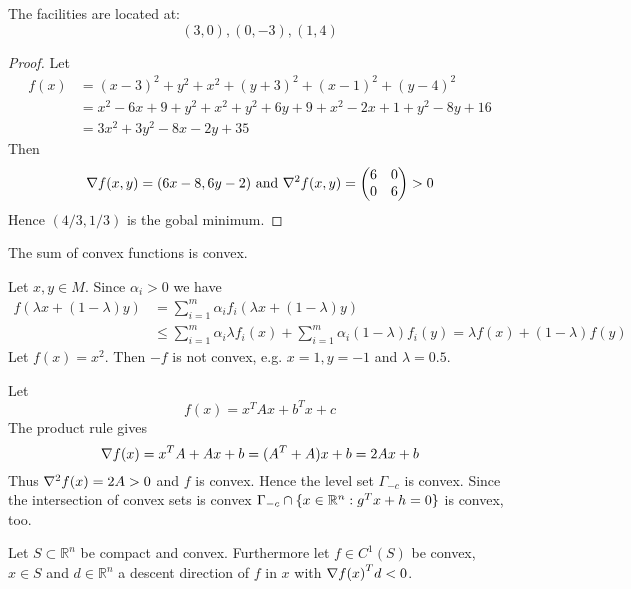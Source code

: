 \begin{exercise}
    The facilities are located at:
    \[
        (3, 0), (0, -3), (1, 4)
    \]
\end{exercise}

\begin{proof}
    Let
    \[
        \begin{split}
            f(x)    & = {(x - 3)}^2 + y^2 + x^2 + {(y + 3)}^2 + {(x - 1)}^2 + {(y - 4)}^2 \\
            & = x^2 - 6x + 9 + y^2 + x^2 + y^2 + 6y + 9 + x^2 - 2x + 1 + y^2 -8y + 16 \\
            & = 3x^2 + 3y^2 - 8x - 2y + 35
        \end{split}
    \]
    Then
    \[
        \nabla f(x, y) = (6x - 8, 6y - 2) \text{ and } \nabla^2 f(x, y) =
        \begin{pmatrix}
            6 & 0 \\
            0 & 6 \\
        \end{pmatrix} > 0
    \]
    Hence \( (4 / 3, 1 / 3) \) is the gobal minimum.
\end{proof}
\bigskip


The sum of convex functions is convex.

\proof{}
Let \( x, y \in M \). Since \( \alpha_i  > 0 \) we have
\[
    \begin{split}
        f(\lambda x + (1 - \lambda) y)
        & = \sum_{i=1}^m \alpha_i f_i(\lambda x + (1 - \lambda) y) \\
        & \le \sum_{i=1}^m \alpha_i \lambda f_i(x) + \sum_{i=1}^m \alpha_i (1 - \lambda) f_i(y)
        =  \lambda f(x) + (1 - \lambda) f(y)
    \end{split}
\]
Let \( f(x) = x^2 \). Then \( -f \) is not convex, e.g. \( x = 1, y = -1 \) and \( \lambda = 0.5 \).
\bigskip


Let
\[
    f(x) = x^{T}Ax + b^{T}x + c
\]
\proof{}
The product rule gives
\[
    \nabla {f(x)} = x^{T}A + Ax + b = (A^{T} + A)x + b = 2Ax + b
\]
Thus \( \nabla^2 {f(x)} = 2A > 0 \) and \( f \) is convex. Hence the level set \( \Gamma_{-c} \) is convex.
Since the intersection of convex sets is convex \( \Gamma_{-c} \cap \{ x \in \mathbb{R}^n: g^{T}x + h = 0 \} \) 
is convex, too.
\bigskip


Let \( S \subset \mathbb{R}^n \) be compact and convex. Furthermore let \( f \in C^1(S) \) be convex,
\( x \in S \) and \( d \in \mathbb{R}^n \) a descent direction of \( f \) in \( x \)
with \( \nabla {f(x)}^T d < 0 \).

